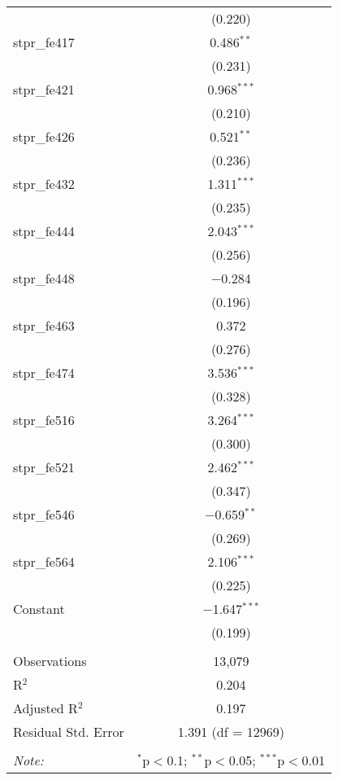 \begin{table}[!htbp]
\begin{tabular}{@{\extracolsep{5pt}}lc}
  & (0.220) \\ 
  stpr\_fe417 & 0.486$^{**}$ \\ 
  & (0.231) \\ 
  stpr\_fe421 & 0.968$^{***}$ \\ 
  & (0.210) \\ 
  stpr\_fe426 & 0.521$^{**}$ \\ 
  & (0.236) \\ 
  stpr\_fe432 & 1.311$^{***}$ \\ 
  & (0.235) \\ 
  stpr\_fe444 & 2.043$^{***}$ \\ 
  & (0.256) \\ 
  stpr\_fe448 & $-$0.284 \\ 
  & (0.196) \\ 
  stpr\_fe463 & 0.372 \\ 
  & (0.276) \\ 
  stpr\_fe474 & 3.536$^{***}$ \\ 
  & (0.328) \\ 
  stpr\_fe516 & 3.264$^{***}$ \\ 
  & (0.300) \\ 
  stpr\_fe521 & 2.462$^{***}$ \\ 
  & (0.347) \\ 
  stpr\_fe546 & $-$0.659$^{**}$ \\ 
  & (0.269) \\ 
  stpr\_fe564 & 2.106$^{***}$ \\ 
  & (0.225) \\ 
  Constant & $-$1.647$^{***}$ \\ 
  & (0.199) \\ 
 \hline \\[-1.8ex] 
Observations & 13,079 \\ 
R$^{2}$ & 0.204 \\ 
Adjusted R$^{2}$ & 0.197 \\ 
Residual Std. Error & 1.391 (df = 12969) \\ 
\hline 
\hline \\[-1.8ex] 
\textit{Note:}  & \multicolumn{1}{r}{$^{*}$p$<$0.1; $^{**}$p$<$0.05; $^{***}$p$<$0.01} \\ 
\end{tabular} 
\end{table} 
